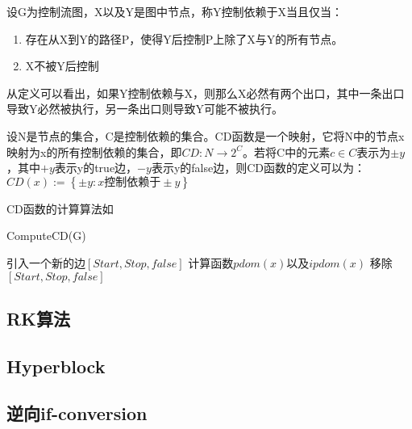 \begin{definition}
设G为控制流图，X以及Y是图中节点，称Y控制依赖于X当且仅当：
\begin{enumerate}
\item 存在从X到Y的路径P，使得Y后控制P上除了X与Y的所有节点。
\item X不被Y后控制
\end{enumerate}
\end{definition}
从定义可以看出，如果Y控制依赖与X，则那么X必然有两个出口，其中一条出口导致Y必然被执行，另一条出口则导致Y可能不被执行。

\begin{definition}[CD函数]
设N是节点的集合，C是控制依赖的集合。CD函数是一个映射，它将N中的节点x映射为x的所有控制依赖的集合，即$CD:N\to 2^C$。若将C中的元素$c\in C$表示为$\pm y$，其中$+y$表示y的true边，$-y$表示y的false边，则CD函数的定义可以为：$CD\left(x\right):=\left\{\pm y:x\text{控制依赖于}\pm y\right\}$
\end{definition}
CD函数的计算算法如

\begin{algorithm}[H]
	\label{alg:ComputeCD}
	\caption{ComputeCD(G)}
	引入一个新的边$\left[Start,Stop,false\right]$\;
	计算函数$pdom\left(x\right)$以及$ipdom\left(x\right)$\;
	移除$\left[Start,Stop,false\right]$\;
\end{algorithm}

\subsection{RK算法}
\subsection{Hyperblock}
\subsection{逆向if-conversion}